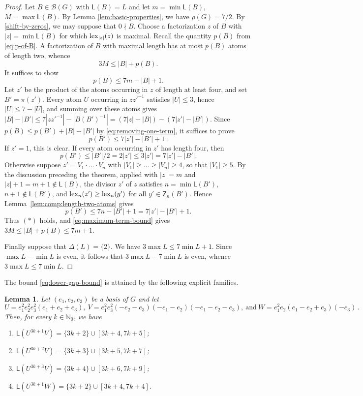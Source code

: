 \documentclass[a4paper, 10pt]{amsart}
\theoremstyle{plain}
\newtheorem{lemma}[theorem]{\bf Lemma}
\theoremstyle{definition}
\theoremstyle{definition}
\newcommand{\N}{\mathbb N}
\numberwithin{equation}{section}
\begin{document}
\begin{proof}
Let $B \in \mathcal B (G)$ with $\mathsf L (B) = L$ and  let $m=\min\mathsf L(B)$,  $M=\max\mathsf L(B)$. By Lemma \ref{lem:basic-properties}, we have $\rho (G)=7/2$.  By \eqref{shift-by-zeros}, we may suppose that  $0\nmid B$. Choose a  factorization $z$ of $B$ with $|z|=\min \mathsf L (B)$ for
which $\operatorname{lex}_{|z|} (z)$ is maximal. Recall the quantity $p(B)$ from \eqref{eq:p-of-B}.  A 
factorization of $B$ with maximal length has at most $p(B)$ atoms of length two, whence
\begin{equation}
 3M\le |B|+p(B).                             \label{eq:maximum-term-bound}
\end{equation}
It suffices to show 
\[
 p(B) \le 7m-|B|+1 .                    \tag{$\ast$}
\]
Let $z'$ be the product of the atoms occurring in $z$ of length at least four,
and set $B' = \pi (z')$.  Every atom $U$ occurring in $z z'^{-1}$ satisfies
$|U| \le 3$, hence $|U| \le 7-|U|$, and summing over
these atoms gives
$|B|-|B'| \le 7|z z'^{-1}|-|B(B')^{-1}| = (7|z|-|B|) -(7|z'|-|B'|)$.
Since $p(B) \le p(B') + |B|-|B'|$ by 
\eqref{eq:removing-one-term}, it suffices to prove
$$p(B') \le 7|z'|-|B'|+1\,.$$  If $z' = 1$, this is clear.  If every
atom occurring in $z'$ has length four, then
\[
 p(B')\le |B'|/2=2|z'|\le3|z'|=7|z'|-|B'|.
\]
Otherwise suppose $z' = V_1 \cdot \ldots \cdot V_n$ with
$|V_1| \ge \ldots \ge |V_n| \ge 4$, so that $|V_1| \ge 5$.  By the discussion
preceding the theorem, applied with $|z| = m$ and
$|z|+1 = m+1 \notin \mathsf L (B)$, the divisor $z'$ of $z$ satisfies
$n = \min \mathsf L (B')$, $n+1 \notin \mathsf L (B')$, and
$\operatorname{lex}_n (z') \ge \operatorname{lex}_n (y')$ for all $y' \in \mathsf Z_n (B')$.  Hence
Lemma~\ref{lem:comp:length-two-atoms} gives
\[
 p(B') \le 7n - |B'| + 1 = 7|z'|-|B'|+1 .
\]
Thus $(\ast)$ holds, and \eqref{eq:maximum-term-bound} gives
$3M \le |B| + p(B) \le 7m+1$.


Finally suppose that $\Delta (L) = \{2\}$. We have $3 \max L   \le 7 \min L+1$.  Since $\max L - \min L$ is even, it follows that $3 \max L - 7 \min L$ is even, whence  $3 \max L \le 7 \min L$.
\end{proof}


The bound \eqref{eq:lower-gap-bound} is attained by the following explicit families.

\begin{lemma}\label{le3.5}
Let $(e_1,e_2,e_3)$ be a basis of $G$ and let
\[
U=e_1^2e_2^2e_3^2(e_1+e_2+e_3), \ V=e_1^2e_3^2(-e_2-e_3)(-e_1-e_2)(-e_1-e_2-e_3), \ \text{and} \ W=e_1^2e_2(e_1-e_2+e_3)(-e_3) \,.
\]
Then, for every $k\in \N_0$, we have
\begin{enumerate}
\item  $\mathsf L(U^{3k+1}V)=\{3k+2\}\cup [3k+4, 7k+5]$;

\item $\mathsf L(U^{3k+2}V)=\{3k+3\}\cup [3k+5, 7k+7]$;

\item $\mathsf L(U^{3k+3}V)=\{3k+4\}\cup [3k+6, 7k+9]$;

\item  $\mathsf L(U^{3k+1}W)=\{3k+2\}\cup [3k+4, 7k+4]$.
\end{enumerate}
\end{lemma}
\end{document}
